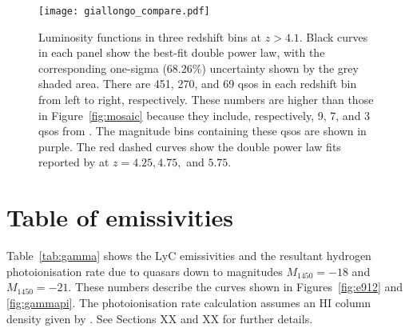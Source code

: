 \documentclass[a4paper,fleqn,usenatbib]{mnras}
\begin{document}
\begin{figure*}
  \begin{center}
    \texttt{[image: giallongo\_compare.pdf]}
  \end{center}
  \caption{Luminosity functions in three redshift bins at $z>4.1$.
    Black curves in each panel show the best-fit double power law,
    with the corresponding one-sigma (68.26\%) uncertainty shown by
    the grey shaded area.  There are 451, 270, and 69 qsos in each
    redshift bin from left to right, respectively.  These numbers are
    higher than those in Figure~\ref{fig:mosaic} because they include,
    respectively, 9, 7, and 3 qsos from \citet{2015AA...578A..83G}.
    The magnitude bins containing these qsos are shown in purple.  The
    red dashed curves show the double power law fits reported by
    \citet{2015AA...578A..83G} at $z=4.25, 4.75,$ and
    $5.75$.}
\end{figure*}

\section{Table of emissivities}
\label{sec:tables}

Table~\ref{tab:gamma} shows the LyC emissivities and the resultant
hydrogen photoionisation rate due to quasars down to magnitudes
$M_{1450}=-18$ and $M_{1450}=-21$.  These numbers describe the curves
shown in Figures~\ref{fig:e912} and \ref{fig:gammapi}.  The
photoionisation rate calculation assumes an HI column density given by
\citet{2012ApJ...746..125H}.  See Sections XX and XX for further
details.
\end{document}
